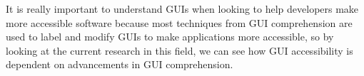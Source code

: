 It is really important to understand GUIs when looking to help developers make more accessible software because most techniques from GUI comprehension are used to label and modify GUIs to make applications more accessible, so by looking at the current research in this field, we can see how GUI accessibility is dependent on advancements in GUI comprehension. 



























